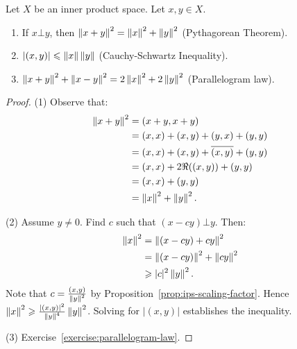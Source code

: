 \begin{theorem}
    Let $X$ be an inner product space. Let $x,y \in X$.
    \begin{enumerate}[label = (\arabic*),itemsep=1pt,topsep=3pt]
        \item If $x \bot y$, then $\left\lVert x+y \right\rVert^2 = \left\lVert x \right\rVert^2 + \left\lVert y \right\rVert^2$ (Pythagorean Theorem).
        \item $|(x,y)| \leqslant \left\lVert x \right\rVert \left\lVert y \right\rVert$ (Cauchy-Schwartz Inequality).
        \item $\left\lVert x+y \right\rVert^2 + \left\lVert x-y \right\rVert^2 = 2 \left\lVert x \right\rVert^2 + 2 \left\lVert y \right\rVert^2$ (Parallelogram law).
    \end{enumerate}
\end{theorem}
    \begin{proof}
        (1) Observe that:
            \begin{equation*}
            \begin{split}
                \left\lVert x+y \right\rVert^2 
                & = (x+y,x+y) \\
                & = (x,x) + (x,y) + (y,x) + (y,y) \\
                & = (x,x) + (x,y) + \overline{(x,y)} + (y,y) \\
                & = (x,x) + 2 \Re((x,y)) + (y,y) \\
                & = (x,x) + (y,y) \\
                & = \left\lVert x \right\rVert^2 + \left\lVert y \right\rVert^2.
            \end{split}
            \end{equation*}

        (2) Assume $y \neq 0$. Find $c$ such that $(x-cy) \bot y$. Then:
            \begin{equation*}
            \begin{split}
                \left\lVert x \right\rVert^2 
                & = \left\lVert (x-cy) + cy \right\rVert^2 \\
                & = \left\lVert (x-cy) \right\rVert^2 + \left\lVert cy \right\rVert^2 \\
                & \geqslant |c|^2 \left\lVert y \right\rVert^2.
            \end{split}
            \end{equation*}
        Note that $c = \frac{(x,y)}{\left\lVert y \right\rVert^2}$ by Proposition~\ref{prop:ips-scaling-factor}. Hence $\left\lVert x \right\rVert^2 \geqslant \frac{|(x,y)|^2}{\left\lVert y \right\rVert^4}\left\lVert y \right\rVert^2$. Solving for $|(x,y)|$ establishes the inequality.

        (3) Exercise~\ref{exercise:parallelogram-law}.
    \end{proof}

